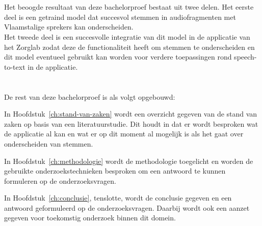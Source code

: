 \section{}%
\label{sec:onderzoeksdoelstelling}

Het beoogde resultaat van deze bachelorproef bestaat uit twee delen. Het eerste deel is een getraind model dat succesvol stemmen in audiofragmenten met Vlaamstalige sprekers kan onderscheiden.\\
Het tweede deel is een succesvolle integratie van dit model in de applicatie van het Zorglab zodat deze de functionaliteit heeft om stemmen te onderscheiden en dit model eventueel gebruikt kan worden voor verdere toepassingen rond speech-to-text in de applicatie.

\section{}%
\label{sec:opzet-bachelorproef}


De rest van deze bachelorproef is als volgt opgebouwd:

In Hoofdstuk~\ref{ch:stand-van-zaken} wordt een overzicht gegeven van de stand van zaken op basis van een literatuurstudie. Dit houdt in dat er wordt besproken wat de applicatie al kan en wat er op dit moment al mogelijk is als het gaat over onderscheiden van stemmen.

In Hoofdstuk~\ref{ch:methodologie} wordt de methodologie toegelicht en worden de gebruikte onderzoekstechnieken besproken om een antwoord te kunnen formuleren op de onderzoeksvragen.


In Hoofdstuk~\ref{ch:conclusie}, tenslotte, wordt de conclusie gegeven en een antwoord geformuleerd op de onderzoeksvragen. Daarbij wordt ook een aanzet gegeven voor toekomstig onderzoek binnen dit domein.